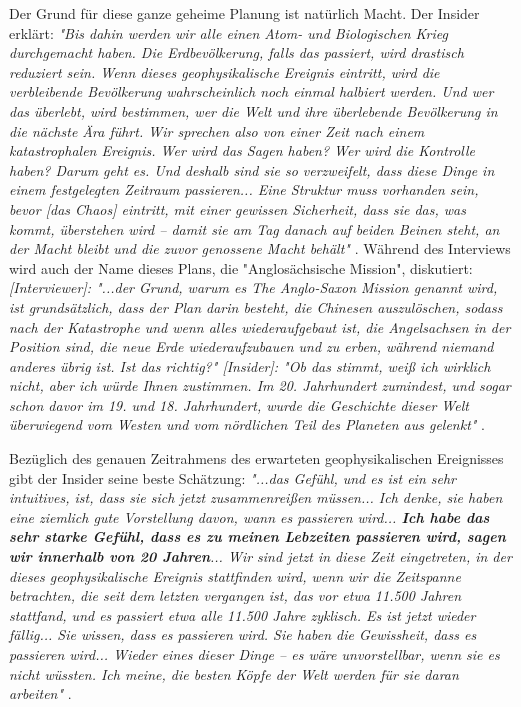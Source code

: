 \documentclass[10pt,twocolumn,letterpaper]{article}
\begin{document}
Der Grund für diese ganze geheime Planung ist natürlich Macht. Der Insider erklärt: \textit{"Bis dahin werden wir alle einen Atom- und Biologischen Krieg durchgemacht haben. Die Erdbevölkerung, falls das passiert, wird drastisch reduziert sein. Wenn dieses geophysikalische Ereignis eintritt, wird die verbleibende Bevölkerung wahrscheinlich noch einmal halbiert werden. Und wer das überlebt, wird bestimmen, wer die Welt und ihre überlebende Bevölkerung in die nächste Ära führt. Wir sprechen also von einer Zeit nach einem katastrophalen Ereignis. Wer wird das Sagen haben? Wer wird die Kontrolle haben? Darum geht es. Und deshalb sind sie so verzweifelt, dass diese Dinge in einem festgelegten Zeitraum passieren... Eine Struktur muss vorhanden sein, bevor [das Chaos] eintritt, mit einer gewissen Sicherheit, dass sie das, was kommt, überstehen wird – damit sie am Tag danach auf beiden Beinen steht, an der Macht bleibt und die zuvor genossene Macht behält"} \cite{4}. Während des Interviews wird auch der Name dieses Plans, die "Anglosächsische Mission", diskutiert: \textit{[Interviewer]: "...der Grund, warum es The Anglo-Saxon Mission genannt wird, ist grundsätzlich, dass der Plan darin besteht, die Chinesen auszulöschen, sodass nach der Katastrophe und wenn alles wiederaufgebaut ist, die Angelsachsen in der Position sind, die neue Erde wiederaufzubauen und zu erben, während niemand anderes übrig ist. Ist das richtig?" [Insider]: "Ob das stimmt, weiß ich wirklich nicht, aber ich würde Ihnen zustimmen. Im 20. Jahrhundert zumindest, und sogar schon davor im 19. und 18. Jahrhundert, wurde die Geschichte dieser Welt überwiegend vom Westen und vom nördlichen Teil des Planeten aus gelenkt"} \cite{4}.

Bezüglich des genauen Zeitrahmens des erwarteten geophysikalischen Ereignisses gibt der Insider seine beste Schätzung: \textit{"...das Gefühl, und es ist ein sehr intuitives, ist, dass sie sich jetzt zusammenreißen müssen... Ich denke, sie haben eine ziemlich gute Vorstellung davon, wann es passieren wird... \textbf{Ich habe das sehr starke Gefühl, dass es zu meinen Lebzeiten passieren wird, sagen wir innerhalb von 20 Jahren}... Wir sind jetzt in diese Zeit eingetreten, in der dieses geophysikalische Ereignis stattfinden wird, wenn wir die Zeitspanne betrachten, die seit dem letzten vergangen ist, das vor etwa 11.500 Jahren stattfand, und es passiert etwa alle 11.500 Jahre zyklisch. Es ist jetzt wieder fällig... Sie wissen, dass es passieren wird. Sie haben die Gewissheit, dass es passieren wird... Wieder eines dieser Dinge – es wäre unvorstellbar, wenn sie es nicht wüssten. Ich meine, die besten Köpfe der Welt werden für sie daran arbeiten"} \cite{4}.
\end{document}
